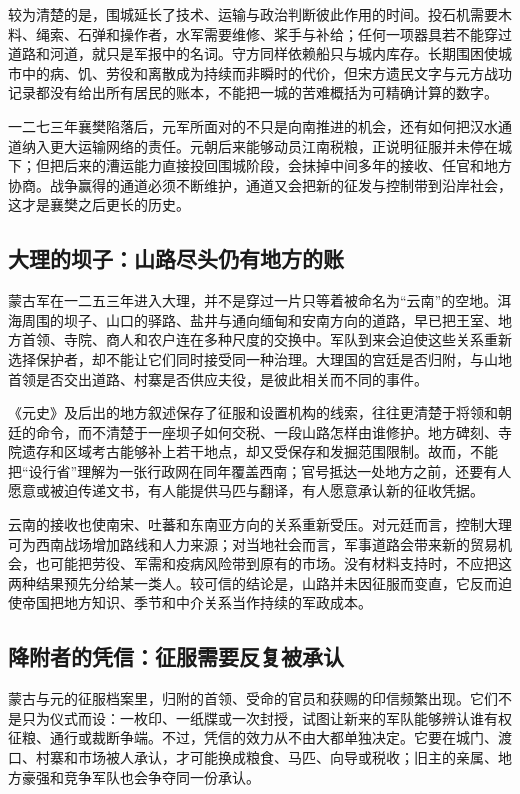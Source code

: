 较为清楚的是，围城延长了技术、运输与政治判断彼此作用的时间。投石机需要木料、绳索、石弹和操作者，水军需要维修、桨手与补给；任何一项器具若不能穿过道路和河道，就只是军报中的名词。守方同样依赖船只与城内库存。长期围困使城市中的病、饥、劳役和离散成为持续而非瞬时的代价，但宋方遗民文字与元方战功记录都没有给出所有居民的账本，不能把一城的苦难概括为可精确计算的数字。

一二七三年襄樊陷落后，元军所面对的不只是向南推进的机会，还有如何把汉水通道纳入更大运输网络的责任。元朝后来能够动员江南税粮，正说明征服并未停在城下；但把后来的漕运能力直接投回围城阶段，会抹掉中间多年的接收、任官和地方协商。战争赢得的通道必须不断维护，通道又会把新的征发与控制带到沿岸社会，这才是襄樊之后更长的历史。

\subsection{大理的坝子：山路尽头仍有地方的账}

蒙古军在一二五三年进入大理，并不是穿过一片只等着被命名为“云南”的空地。洱海周围的坝子、山口的驿路、盐井与通向缅甸和安南方向的道路，早已把王室、地方首领、寺院、商人和农户连在多种尺度的交换中。军队到来会迫使这些关系重新选择保护者，却不能让它们同时接受同一种治理。大理国的宫廷是否归附，与山地首领是否交出道路、村寨是否供应夫役，是彼此相关而不同的事件。

《元史》及后出的地方叙述保存了征服和设置机构的线索，往往更清楚于将领和朝廷的命令，而不清楚于一座坝子如何交税、一段山路怎样由谁修护。地方碑刻、寺院遗存和区域考古能够补上若干地点，却又受保存和发掘范围限制。故而，不能把“设行省”理解为一张行政网在同年覆盖西南；官号抵达一处地方之前，还要有人愿意或被迫传递文书，有人能提供马匹与翻译，有人愿意承认新的征收凭据。

云南的接收也使南宋、吐蕃和东南亚方向的关系重新受压。对元廷而言，控制大理可为西南战场增加路线和人力来源；对当地社会而言，军事道路会带来新的贸易机会，也可能把劳役、军需和疫病风险带到原有的市场。没有材料支持时，不应把这两种结果预先分给某一类人。较可信的结论是，山路并未因征服而变直，它反而迫使帝国把地方知识、季节和中介关系当作持续的军政成本。

\subsection{降附者的凭信：征服需要反复被承认}

蒙古与元的征服档案里，归附的首领、受命的官员和获赐的印信频繁出现。它们不是只为仪式而设：一枚印、一纸牒或一次封授，试图让新来的军队能够辨认谁有权征粮、通行或裁断争端。不过，凭信的效力从不由大都单独决定。它要在城门、渡口、村寨和市场被人承认，才可能换成粮食、马匹、向导或税收；旧主的亲属、地方豪强和竞争军队也会争夺同一份承认。

